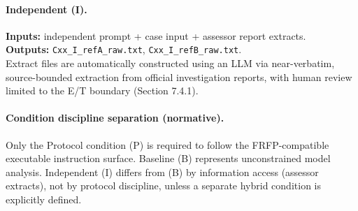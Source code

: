 \paragraph{Independent (I).}
\textbf{Inputs:} independent prompt + case input + assessor report extracts.\\
\textbf{Outputs:} \texttt{Cxx\_I\_refA\_raw.txt}, \texttt{Cxx\_I\_refB\_raw.txt}.\\
Extract files are automatically constructed using an LLM via near-verbatim, source-bounded extraction from official investigation reports, with human review limited to the E/T boundary (Section 7.4.1).
\paragraph{Condition discipline separation (normative).}
Only the Protocol condition (P) is required to follow the FRFP-compatible executable
instruction surface. Baseline (B) represents unconstrained model analysis.
Independent (I) differs from (B) by information access (assessor extracts), not by
protocol discipline, unless a separate hybrid condition is explicitly defined.

